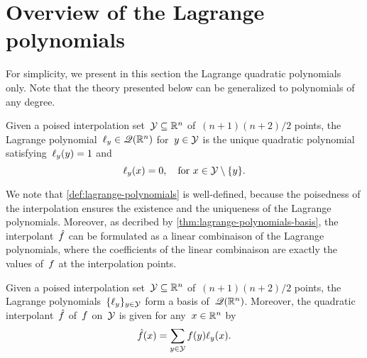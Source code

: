 \section{Overview of the Lagrange polynomials}
\label{sec:lagrange-polynomials}

For simplicity, we present in this section the Lagrange quadratic polynomials only.
Note that the theory presented below can be generalized to polynomials of any degree.

\begin{definition}
    \label{def:lagrange-polynomials}
    Given a poised interpolation set~$\xpt \subseteq \R^n$ of~$(n + 1)(n + 2) / 2$ points, the Lagrange polynomial~$\lagp[y] \in \qpoly$ for~$y \in \xpt$ is the unique quadratic polynomial satisfying~$\lagp[y](y) = 1$ and
    \begin{equation*}
        \lagp[y](x) = 0, \quad \text{for~$x \in \xpt \setminus \set{y}$}.
    \end{equation*}
\end{definition}

We note that \cref{def:lagrange-polynomials} is well-defined, because the poisedness of the interpolation ensures the existence and the uniqueness of the Lagrange polynomials.
Moreover, as decribed by \cref{thm:lagrange-polynomials-basis}, the interpolant~$\objm$ can be formulated as a linear combinaison of the Lagrange polynomials, where the coefficients of the linear combinaison are exactly the values of~$f$ at the interpolation points.

\begin{theorem}
    \label{thm:lagrange-polynomials-basis}
    Given a poised interpolation set~$\xpt \subseteq \R^n$ of~$(n + 1)(n + 2) / 2$ points, the Lagrange polynomials~$\set{\lagp[y]}_{y \in \xpt}$ form a basis of~$\mathscr{Q}(\mathbb{R}^n)$.
    Moreover, the quadratic interpolant~$\objm$ of~$f$ on~$\xpt$ is given for any~$x \in \mathbb{R}^n$ by
    \begin{equation*}
        \objm(x) = \sum_{y \in \xpt} \obj(y) \lagp[y](x).
    \end{equation*}
\end{theorem}

